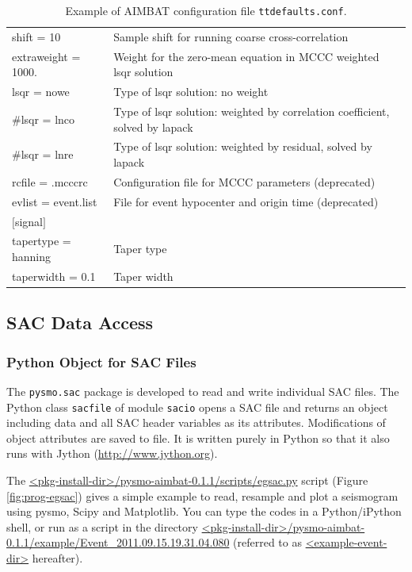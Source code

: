 \documentclass[12pt, titlepage]{article}
\begin{document}
\begin{table}[h!]
{\begin{tabular}{l l}
shift = 10				& Sample shift for running coarse cross-correlation \\
extraweight = 1000.		& Weight for the zero-mean equation in MCCC weighted lsqr solution \\
lsqr = nowe			& Type of lsqr solution: no weight \\
\#lsqr = lnco				& Type of lsqr solution: weighted by correlation coefficient, solved by lapack \\
\#lsqr = lnre				& Type of lsqr solution: weighted by residual, solved by lapack \\
rcfile = .mcccrc			& Configuration file for MCCC parameters (deprecated) \\
evlist = event.list		& File for event hypocenter and origin time (deprecated) \\
\cmidrule(l){1-1}
$[$signal$]$ 			& \\
tapertype = hanning		& Taper type \\
taperwidth = 0.1		& Taper width \\

\bottomrule
\end{tabular}
}
\caption{Example of AIMBAT configuration file \texttt{ttdefaults.conf}.} 
\label{table:config}
\end{table} 


\subsection{SAC Data Access}

\subsubsection{Python Object for SAC Files}


The \texttt{pysmo.sac} package is developed to read and write individual SAC files.
The Python class \texttt{sacfile} of module \texttt{sacio} opens a SAC file and returns an object including data and all SAC header variables as its attributes. Modifications of object attributes are saved to file. It is written purely in Python so that it also runs with Jython (\url{http://www.jython.org}).
  	

The \url{<pkg-install-dir>/pysmo-aimbat-0.1.1/scripts/egsac.py} script (Figure \ref{fig:prog-egsac}) gives a simple example to read, resample and plot a seismogram using pysmo, Scipy and Matplotlib.
You can type the codes in a Python/iPython shell, or run as a script in the directory \url{<pkg-install-dir>/pysmo-aimbat-0.1.1/example/Event_2011.09.15.19.31.04.080}
 (referred to as \url{<example-event-dir>} hereafter).
\end{document}
